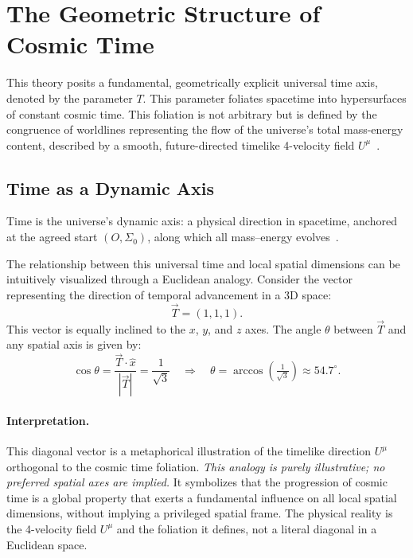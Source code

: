 \documentclass[12pt]{article}
\theoremstyle{plain} %
\begin{document}
\section*{The Geometric Structure of Cosmic Time}
This theory posits a fundamental, geometrically explicit universal time axis, denoted by the parameter $T$. This parameter foliates spacetime into hypersurfaces of constant cosmic time. This foliation is not arbitrary but is defined by the congruence of worldlines representing the flow of the universe's total mass-energy content, described by a smooth, future-directed timelike 4-velocity field $U^\mu$~\cite{Carroll2004}.

\subsection*{Time as a Dynamic Axis}
Time is the universe’s dynamic axis: a physical direction in spacetime, anchored at the agreed start $(O,\Sigma_0)$, along which all mass–energy evolves~\cite{Rindler2006}.

\medskip
\noindent The relationship between this universal time and local spatial dimensions can be intuitively visualized through a Euclidean analogy. Consider the vector representing the direction of temporal advancement in a 3D space:
\[
\vec{T} = (1,1,1).
\]
This vector is equally inclined to the $x$, $y$, and $z$ axes. The angle $\theta$ between $\vec{T}$ and any spatial axis is given by:
\[
\cos \theta = \frac{\vec{T} \cdot \hat{x}}{|\vec{T}|} = \frac{1}{\sqrt{3}} \quad \Rightarrow \quad \theta = \arccos\left(\tfrac{1}{\sqrt{3}}\right) \approx 54.7^\circ.
\]

\paragraph{Interpretation.}
This diagonal vector is a metaphorical illustration of the timelike direction $U^\mu$ orthogonal to the cosmic time foliation. \emph{This analogy is purely illustrative; no preferred spatial axes are implied.} It symbolizes that the progression of cosmic time is a global property that exerts a fundamental influence on all local spatial dimensions, without implying a privileged spatial frame. The physical reality is the 4-velocity field $U^\mu$ and the foliation it defines, not a literal diagonal in a Euclidean space.
\end{document}
